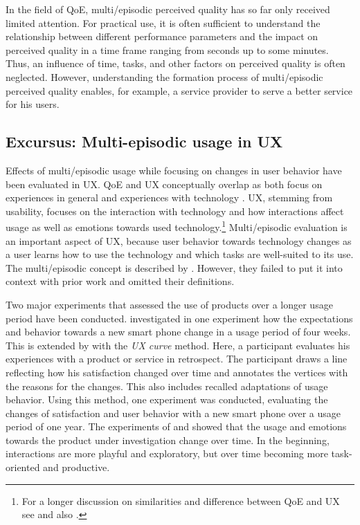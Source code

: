 In the field of \ac{QoE}, multi\-/episodic perceived quality has so far only received limited attention.
For practical use, it is often sufficient to understand the relationship between different performance parameters and the impact on perceived quality in a time frame ranging from seconds up to some minutes.
Thus, an influence of time, tasks, and other factors on perceived quality is often neglected.
However, understanding the formation process of multi\-/episodic perceived quality enables, for example, a service provider to serve a better service for his users.

\subsection{Excursus: Multi-episodic usage in \acs{UX}}
Effects of multi\-/episodic usage while focusing on changes in user behavior have been evaluated in \ac{UX}.
\ac{QoE} and \ac{UX} conceptually overlap as both focus on experiences in general and experiences with technology \citep[\cf{}][]{wechsung_quality_2014}.
\ac{UX}, stemming from usability, focuses on the interaction with technology and how interactions affect usage as well as emotions towards used technology.\footnote{For a longer discussion on similarities and difference between \ac{QoE} and \ac{UX} see \citet{wechsung_quality_2014} and also \citet{hassenzahl_user_2008}.}
Multi\-/episodic evaluation is an important aspect of \ac{UX}, because user behavior towards technology changes as a user learns how to use the technology and which tasks are well-suited to its use.
The multi\-/episodic concept is described by \citet[p.\,8]{roto_user_2011}.
However, they failed to put it into context with prior work and omitted their definitions.

Two major experiments that assessed the use of products over a longer usage period have been conducted.
\citet{karapanos_user_2009} investigated in one experiment how the expectations and behavior towards a new smart phone change in a usage period of four weeks. %
This is extended by \citet{kujala_ux_2011} with the \emph{\ac{UX} curve} method.
Here, a participant evaluates his experiences with a product or service in retrospect.
The participant draws a line reflecting how his satisfaction changed over time and annotates the vertices with the reasons for the changes.
This also includes recalled adaptations of usage behavior.
Using this method, one experiment was conducted, evaluating the changes of satisfaction and user behavior with a new smart phone over a usage period of one year.
The experiments of \citet{karapanos_user_2009} and \citet{kujala_ux_2011} showed that the usage and emotions towards the product under investigation change over time.
In the beginning, interactions are more playful and exploratory, but over time becoming more task-oriented and productive.

